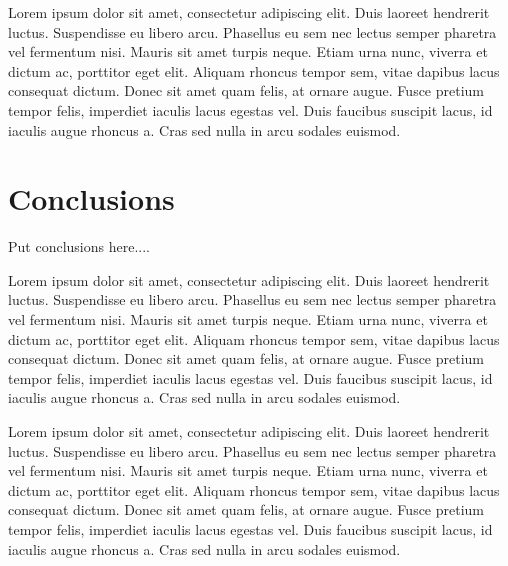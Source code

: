 \documentclass[final,conference,11pt]{IEEEtran}
\begin{document}
Lorem ipsum dolor sit amet, consectetur adipiscing elit. Duis laoreet hendrerit luctus. Suspendisse eu libero arcu. Phasellus eu sem nec lectus semper pharetra vel fermentum nisi. Mauris sit amet turpis neque. Etiam urna nunc, viverra et dictum ac, porttitor eget elit. Aliquam rhoncus tempor sem, vitae dapibus lacus consequat dictum. Donec sit amet quam felis, at ornare augue. Fusce pretium tempor felis, imperdiet iaculis lacus egestas vel. Duis faucibus suscipit lacus, id iaculis augue rhoncus a. Cras sed nulla in arcu sodales euismod.

\section{Conclusions}

Put conclusions here....

Lorem ipsum dolor sit amet, consectetur adipiscing elit. Duis laoreet hendrerit luctus. Suspendisse eu libero arcu. Phasellus eu sem nec lectus semper pharetra vel fermentum nisi. Mauris sit amet turpis neque. Etiam urna nunc, viverra et dictum ac, porttitor eget elit. Aliquam rhoncus tempor sem, vitae dapibus lacus consequat dictum. Donec sit amet quam felis, at ornare augue. Fusce pretium tempor felis, imperdiet iaculis lacus egestas vel. Duis faucibus suscipit lacus, id iaculis augue rhoncus a. Cras sed nulla in arcu sodales euismod.

Lorem ipsum dolor sit amet, consectetur adipiscing elit. Duis laoreet hendrerit luctus. Suspendisse eu libero arcu. Phasellus eu sem nec lectus semper pharetra vel fermentum nisi. Mauris sit amet turpis neque. Etiam urna nunc, viverra et dictum ac, porttitor eget elit. Aliquam rhoncus tempor sem, vitae dapibus lacus consequat dictum. Donec sit amet quam felis, at ornare augue. Fusce pretium tempor felis, imperdiet iaculis lacus egestas vel. Duis faucibus suscipit lacus, id iaculis augue rhoncus a. Cras sed nulla in arcu sodales euismod.



\pagebreak
\end{document}
